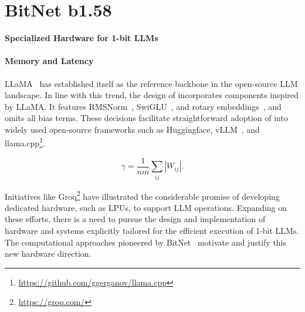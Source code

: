 \section{BitNet b1.58}

\textbf{Specialized Hardware for 1-bit LLMs}

\paragraph{Memory and Latency}

LLaMA~\cite{llama, llama2} has established itself as the reference backbone in the open-source LLM landscape. In line with this trend, the design of  incorporates components inspired by LLaMA. It features RMSNorm~\cite{rmsnorm}, SwiGLU~\cite{swiglu}, and rotary embeddings~\cite{rope}, and omits all bias terms. These decisions facilitate straightforward adoption of  into widely used open-source frameworks such as Huggingface, vLLM~\cite{vllm}, and llama.cpp\footnote{\url{https://github.com/ggerganov/llama.cpp}}.

\begin{equation}
    \gamma = \frac{1}{nm}\sum_{ij} |W_{ij}|.
\end{equation}

Initiatives like Groq\footnote{\url{https://groq.com/}} have illustrated the considerable promise of developing dedicated hardware, such as LPUs, to support LLM operations. Expanding on these efforts, there is a need to pursue the design and implementation of hardware and systems explicitly tailored for the efficient execution of 1-bit LLMs. The computational approaches pioneered by BitNet~\cite{bitnet} motivate and justify this new hardware direction.


\begin{abstract}
Recent advances, exemplified by BitNet~\cite{bitnet}, are ushering in a new generation of 1-bit Large Language Models (LLMs). In this paper, we propose a novel 1-bit LLM variant, designated as \textbf{}, where each parameter (or weight) assumes ternary values from \{-1, 0, 1\}. This model is able to attain parity with its full-precision counterparts (i.e., FP16 or BF16 Transformer LLMs) of equivalent architecture and token count, achieving similar perplexity and downstream task results. Importantly, this 1.58-bit configuration yields dramatic reductions in latency, memory footprint, computational throughput, and energy demands, thereby delivering substantial improvements in efficiency. On a deeper level, the 1.58-bit LLM offers a fresh scaling law and a training strategy that enables future LLM generations to reach both high performance and heightened cost-effectiveness. Additionally, this innovation facilitates novel computational frameworks and catalyzes the development of specialized hardware tailored for 1-bit LLM workloads.
\end{abstract}

